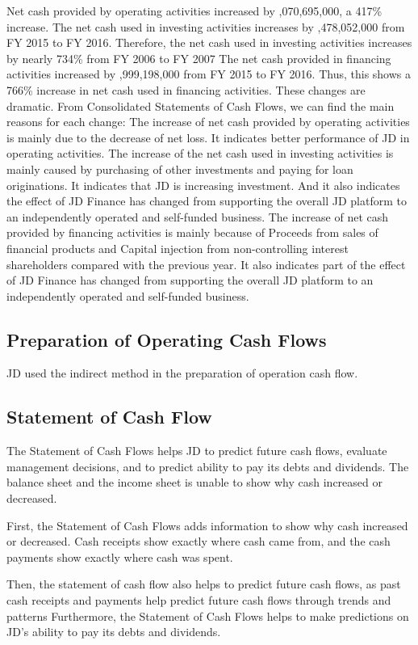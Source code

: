 Net cash provided by operating activities increased by ,070,695,000, a 417\% increase.  
The net cash used in investing activities increases by ,478,052,000 from FY 2015 to FY 2016. Therefore, the net cash used in investing activities increases by nearly 734\% from FY 2006 to FY 2007
The net cash provided in financing activities increased by ,999,198,000 from FY 2015 to FY 2016. Thus, this shows a 766\% increase in net cash used in financing activities.
These changes are dramatic. From Consolidated Statements of Cash Flows, we can find the main reasons for each change:
The increase of net cash provided by operating activities is mainly due to the decrease of net loss. It indicates better performance of JD in operating activities.
The increase of the net cash used in investing activities is mainly caused by purchasing of other investments and paying for loan originations. It indicates that JD is increasing investment. And it also indicates the effect of JD Finance has changed from supporting the overall JD platform to an independently operated and self-funded business.
The increase of net cash provided by financing activities is mainly because of Proceeds from sales of financial products and Capital injection from non-controlling interest shareholders compared with the previous year. It also indicates part of the effect of JD Finance has changed from supporting the overall JD platform to an independently operated and self-funded business.

\subsection{Preparation of Operating Cash Flows}
JD used the indirect method in the preparation of operation cash flow.

\subsection{Statement of Cash Flow}
The Statement of Cash Flows helps JD to predict future cash flows, evaluate management decisions, and to predict ability to pay its debts and dividends. The balance sheet and the income sheet is unable to show why cash increased or decreased.   

First, the Statement of Cash Flows adds information to show why cash increased or decreased. Cash receipts show exactly where cash came from, and the cash payments show exactly where cash was spent. 

Then, the statement of cash flow also helps to predict future cash flows, as past cash receipts and payments help predict future cash flows through trends and patterns
Furthermore, the Statement of Cash Flows helps to make predictions on JD’s ability to pay its debts and dividends. 

